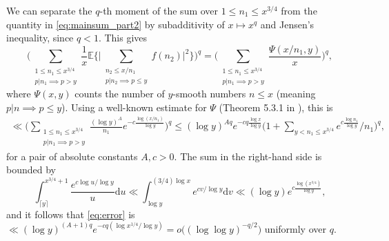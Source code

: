 \documentclass{amsart}
\theoremstyle{definition}
\theoremstyle{remark}
\numberwithin{equation}{section}
\begin{document}
We can separate the $q$-th moment of the sum over $1\leq n_1\leq x^{3/4}$ from the quantity in \eqref{eq:mainsum_part2} by subadditivity of $x\mapsto x^q$ and Jensen's inequality, since $q<1$. This gives 
\[
    \Bigg(\sum_{\substack{1\leq n_1\leq x^{3/4}\\p|n_1\implies p>y}} \frac{1}{x}\mathbb{E}\bigg\{\bigg|\sum_{\substack{n_2\leq x/n_1\\ p|n_2\implies p\leq y}} f(n_2)\bigg|^{2}\bigg\}\Bigg)^q=\Bigg( \sum_{\substack{1\leq n_1\leq x^{3/4}\\p|n_1\implies p>y}} \frac{\Psi(x/n_1, y)}{x}\Bigg)^{q},
\]
where $\Psi(x,y)$ counts the number of $y$-smooth numbers $n\leq x$ (meaning $p|n\!\!\implies\!\! p\leq y$). Using a well-known estimate for $\Psi$ (Theorem 5.3.1 in \cite{CojocaruMurty}), this is
\begin{align}\label{eq:error}
	\ll \bigg(\sum_{\substack{1\leq n_1 \leq x^{3/4}\\ p|n_1\implies p>y}} \frac{(\log y)^{A}}{n_1} e^{-c\tfrac{\log(x/n_1)}{\log y}}\bigg)^q\leq {(\log y)^{Aq}}e^{-cq\tfrac{\log x}{\log y}} \bigg(1+\sum_{y<n_1\leq x^{3/4}} e^{c\tfrac{\log n_1}{\log y}}/n_1\bigg)^q,
\end{align}
for a pair of absolute constants $A,c>0$. The sum in the right-hand side is bounded by
\[
    \int_{\lceil y\rceil}^{x^{3/4}+1} \frac{e^{c\log u/\log y}}{u}\mathrm{d}u\ll \int_{\log y}^{(3/4)\log x} e^{cv/\log y}\mathrm{d}v\ll (\log y) e^{c\tfrac{\log (x^{3/4})}{\log y}},
\]
and it follows that \eqref{eq:error} is $\ll (\log y)^{(A+1)q}e^{-cq(\log x^{1/4}/\log y)}=o\big((\log\log y)^{-q/2}\big)$ uniformly over $q$.
\end{document}
